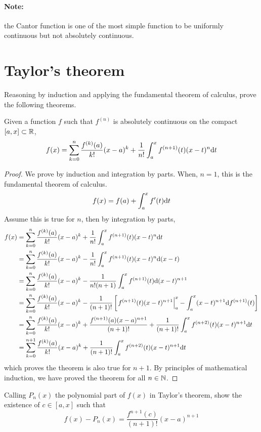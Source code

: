 \paragraph{Note:} the Cantor function is one of the most simple function to be uniformly continuous but not absolutely continuous.

\section{Taylor's theorem}
Reasoning by induction and applying the fundamental theorem of calculus, prove the following theorems.
\begin{theorem}
    Given a function $f$ such that \(f^{(n)}\) is absolutely continuous on the compact \([a,x] \subset \mathbb{R}\),
    \[ f(x)=\sum_{k=0}^n\frac{f^{(k)}(a)}{k!}(x-a)^k+\frac{1}{n!}\int_{a}^{x} f^{(n+1)}(t)(x-t)^n \mathrm{d} t \]
\end{theorem}
\begin{proof}
We prove by induction and integration by parts.
When, \(n=1\), this is the fundamental theorem of calculus.
\[ f(x)=f(a)+\int_a^x f'(t)\mathrm{d} t \]
Assume this is true for $n$, then by integration by parts,
\begin{align*}
f(x)&=\sum_{k=0}^n\frac{f^{(k)}(a)}{k!}(x-a)^k+\frac{1}{n!}\int_{a}^{x} f^{(n+1)}(t)(x-t)^n \mathrm{d} t\\
	&=\sum_{k=0}^n\frac{f^{(k)}(a)}{k!}(x-a)^k-\frac{1}{n!}\int_{a}^{x} f^{(n+1)}(t)(x-t)^n \mathrm{d} (x-t)\\
    &=\sum_{k=0}^n\frac{f^{(k)}(a)}{k!}(x-a)^k-\frac{1}{n!(n+1)}\int_{a}^{x} f^{(n+1)}(t) \mathrm{d} (x-t)^{n+1}\\
    &=\sum_{k=0}^n\frac{f^{(k)}(a)}{k!}(x-a)^k-\frac{1}{(n+1)!}\left[ \left. f^{(n+1)}(t)(x-t)^{n+1}\right|_{a}^{x} - \int_{a}^{x} (x-t)^{n+1} \mathrm{d} f^{(n+1)}(t) \right]\\
    &=\sum_{k=0}^n\frac{f^{(k)}(a)}{k!}(x-a)^k+ \frac{f^{(n+1)}(a)(x-a)^{n+1}}{(n+1)!}  + \frac{1}{(n+1)!} \int_{a}^{x} f^{(n+2)}(t) (x-t)^{n+1} \mathrm{d} t\\
    &=\sum_{k=0}^{n+1}\frac{f^{(k)}(a)}{k!}(x-a)^k+\frac{1}{(n+1)!}\int_{a}^{x} f^{(n+2)}(t)(x-t)^{n+1} \mathrm{d} t
\end{align*}
which proves the theorem is also true for $n+1$.
By principles of mathematical induction, we have proved the theorem for all \(n\in\mathbb{N}\).
\end{proof}
\begin{theorem}
Calling \(P_n(x)\) the polynomial part of \(f(x)\) in Taylor's theorem, show the existence of \(c\in[a,x]\) such that
\[ f(x)-P_n(x)=\frac{f^{n+1}(c)}{(n+1)!}(x-a)^{n+1} \]
\end{theorem}
